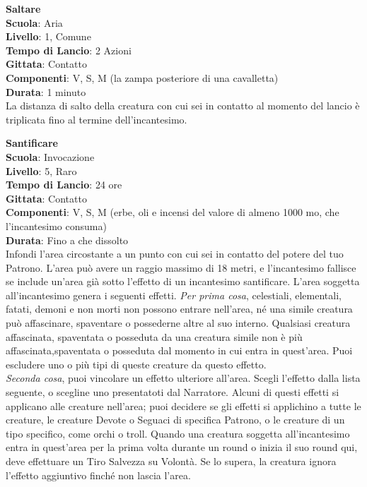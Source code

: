 \begin{multicols}{2}
\medskip\textbf{Saltare}\\
\textbf{Scuola}: Aria\\
\textbf{Livello}: 1, Comune\\
\textbf{Tempo di Lancio}: 2 Azioni\\
\textbf{Gittata}: Contatto\\
\textbf{Componenti}: V, S, M (la zampa posteriore di una cavalletta)\\
\textbf{Durata}: 1 minuto\\
La distanza di salto della creatura con cui sei in contatto al momento del lancio è triplicata fino al termine dell'incantesimo.

\medskip\textbf{Santificare}\\
\textbf{Scuola}: Invocazione\\
\textbf{Livello}: 5, Raro\\
\textbf{Tempo di Lancio}: 24 ore\\
\textbf{Gittata}: Contatto\\
\textbf{Componenti}: V, S, M (erbe, oli e incensi del valore di almeno 1000 mo, che l'incantesimo consuma)\\
\textbf{Durata}: Fino a che dissolto\\
Infondi l'area circostante a un punto con cui sei in contatto del potere del tuo Patrono. L'area può avere un raggio massimo di 18 metri, e l'incantesimo fallisce se include un'area già sotto l'effetto di un incantesimo santificare. L'area soggetta all'incantesimo genera i seguenti effetti.
\textit{Per prima cosa}, celestiali, elementali, fatati, demoni e non morti non possono entrare nell'area, né una simile creatura può affascinare, spaventare o possederne altre al suo interno. Qualsiasi creatura affascinata, spaventata o posseduta da una creatura simile non è più affascinata,spaventata o posseduta dal momento in cui entra in quest'area. Puoi escludere uno o più tipi di queste creature da questo effetto.\\
\textit{Seconda cosa}, puoi vincolare un effetto ulteriore all'area. Scegli l'effetto dalla lista seguente, o scegline uno presentatoti dal Narratore. Alcuni di questi effetti si applicano alle creature nell'area; puoi decidere se gli effetti si applichino a tutte le creature, le creature Devote o Seguaci di specifica Patrono, o le creature di un tipo specifico, come orchi o troll. Quando una creatura soggetta all'incantesimo entra in quest'area per la prima volta durante un round o inizia il suo round qui, deve effettuare un Tiro Salvezza su Volontà. Se lo supera, la creatura ignora l'effetto aggiuntivo finché non lascia l'area.\\


\end{multicols}
